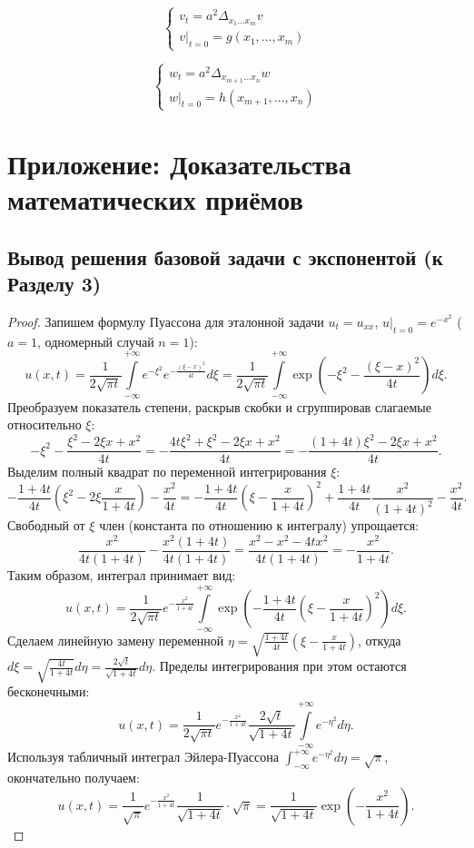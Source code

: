 \noindent
\begin{minipage}{0.45\textwidth}
\[ \begin{cases} v_t = a^2 \Delta_{x_1 \dots x_m} v \\ v|_{t=0} = g(x_1, \dots, x_m) \end{cases} \]
\end{minipage}
\hfill
\begin{minipage}{0.45\textwidth}
\[ \begin{cases} w_t = a^2 \Delta_{x_{m+1} \dots x_n} w \\ w|_{t=0} = h(x_{m+1}, \dots, x_n) \end{cases} \]
\end{minipage}

\newpage
\appendix
\section{Приложение: Доказательства математических приёмов}

\subsection*{Вывод решения базовой задачи с экспонентой (к Разделу 3)}
\begin{proof}
Запишем формулу Пуассона для эталонной задачи $u_t = u_{xx}$, $u|_{t=0} = e^{-x^2}$ ($a=1$, одномерный случай $n=1$):
\[
u(x,t) = \frac{1}{2\sqrt{\pi t}} \int\limits_{-\infty}^{+\infty} e^{-\xi^2} e^{-\frac{(\xi-x)^2}{4t}} d\xi = \frac{1}{2\sqrt{\pi t}} \int\limits_{-\infty}^{+\infty} \exp\left( -\xi^2 - \frac{(\xi-x)^2}{4t} \right) d\xi.
\]
Преобразуем показатель степени, раскрыв скобки и сгруппировав слагаемые относительно $\xi$:
\[
-\xi^2 - \frac{\xi^2 - 2\xi x + x^2}{4t} = -\frac{4t\xi^2 + \xi^2 - 2\xi x + x^2}{4t} = -\frac{(1+4t)\xi^2 - 2\xi x + x^2}{4t}.
\]
Выделим полный квадрат по переменной интегрирования $\xi$:
\[
-\frac{1+4t}{4t} \left( \xi^2 - 2\xi \frac{x}{1+4t} \right) - \frac{x^2}{4t} = -\frac{1+4t}{4t} \left( \xi - \frac{x}{1+4t} \right)^2 + \frac{1+4t}{4t} \frac{x^2}{(1+4t)^2} - \frac{x^2}{4t}.
\]
Свободный от $\xi$ член (константа по отношению к интегралу) упрощается:
\[
\frac{x^2}{4t(1+4t)} - \frac{x^2(1+4t)}{4t(1+4t)} = \frac{x^2 - x^2 - 4tx^2}{4t(1+4t)} = -\frac{x^2}{1+4t}.
\]
Таким образом, интеграл принимает вид:
\[
u(x,t) = \frac{1}{2\sqrt{\pi t}} e^{-\frac{x^2}{1+4t}} \int\limits_{-\infty}^{+\infty} \exp\left( -\frac{1+4t}{4t} \left( \xi - \frac{x}{1+4t} \right)^2 \right) d\xi.
\]
Сделаем линейную замену переменной $\eta = \sqrt{\frac{1+4t}{4t}} \left( \xi - \frac{x}{1+4t} \right)$, откуда $d\xi = \sqrt{\frac{4t}{1+4t}} d\eta = \frac{2\sqrt{t}}{\sqrt{1+4t}} d\eta$. Пределы интегрирования при этом остаются бесконечными:
\[
u(x,t) = \frac{1}{2\sqrt{\pi t}} e^{-\frac{x^2}{1+4t}} \frac{2\sqrt{t}}{\sqrt{1+4t}} \int\limits_{-\infty}^{+\infty} e^{-\eta^2} d\eta.
\]
Используя табличный интеграл Эйлера-Пуассона $\int_{-\infty}^{+\infty} e^{-\eta^2} d\eta = \sqrt{\pi}$, окончательно получаем:
\[
u(x,t) = \frac{1}{\sqrt{\pi}} e^{-\frac{x^2}{1+4t}} \frac{1}{\sqrt{1+4t}} \cdot \sqrt{\pi} = \frac{1}{\sqrt{1+4t}} \exp\left(-\frac{x^2}{1+4t}\right).
\]
\end{proof}

